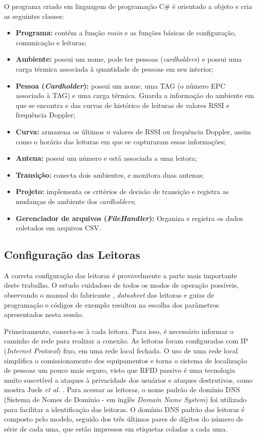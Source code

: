  O programa criado em linguagem de programação C\# é orientado a objeto e cria as seguintes classes:
 
 \begin{itemize}
     \item \textbf{Programa:} contém a função \textit{main} e as funções básicas de configuração, comunicação e leituras;
     \item \textbf{Ambiente:} possui um nome, pode ter pessoas (\textit{cardholders}) e possui uma carga térmica associada à quantidade de pessoas em seu interior;
     \item \textbf{Pessoa (\textit{Cardholder}):} possui um nome, uma TAG (o número EPC associado à TAG) e uma carga térmica. Guarda a informação do ambiente em que se encontra e das curvas de histórico de leituras de valores RSSI e frequência Doppler;
     \item \textbf{Curva:} armazena os últimos $n$ valores de RSSI ou frequência Doppler, assim como o horário das leituras em que se capturaram essas informações;
     \item \textbf{Antena:} possui um número e está associada a uma leitora;
     \item \textbf{Transição:} conecta dois ambientes, e monitora duas antenas;
     \item \textbf{Projeto:} implementa os critérios de decisão de transição e registra as mudanças de ambiente dos \textit{cardholders};
     \item \textbf{Gerenciador de arquivos (\textit{FileHandler}):} Organiza e registra os dados coletados em arquivos CSV.
 \end{itemize}
 
 \subsection{Configuração das Leitoras}

  A correta configuração das leitoras é provavelmente a parte mais importante deste trabalho. O estudo cuidadoso de todos os modos de operação possíveis, observando o manual do fabricante \cite{SpeedwayRUserManual}, \textit{datasheet} das leitoras \cite{SpeedwayRDatasheet} e guias de programação e códigos de exemplo \cite{OctaneSDK} resultou na escolha dos parâmetros apresentados nesta sessão.
  
  Primeiramente, conecta-se à cada leitora. Para isso, é necessário informar o caminho de rede para realizar a conexão. As leitoras foram configuradas com IP (\textit{Internet Protocol}) fixo, em uma rede local fechada. O uso de uma rede local simplifica o comissionamento dos equipamentos e torna o sistema de localização de pessoas um pouco mais seguro, visto que RFID passivo é uma tecnologia muito suscetível a ataques à privacidade dos usuários e ataques destrutivos, como mostra Juels \textit{et al.} \cite{juels2006rfid}. Para acessar as leitoras, o nome padrão de domínio DNS (Sistema de Nomes de Domínio - em inglês \textit{Domain Name System}) foi utilizado para facilitar a identificação das leitoras. O domínio DNS padrão das leitoras é composto pelo modelo, seguido dos três últimos pares de dígitos do número de série de cada uma, que estão impressos em etiquetas coladas a cada uma.

